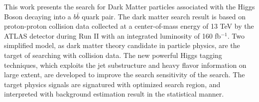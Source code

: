 This work presents the search for Dark Matter particles associated with the Higgs Boson decaying into a $b\bar{b}$ quark pair. 
The dark matter search result is based on proton-proton collision data collected at a center-of-mass energy of 13 TeV by the ATLAS detector during Run II with an integrated luminosity of 160 fb$^{-1}$. 
Two simplified model, as dark matter theory candidate in particle physics, are the target of searching with collision data. 
The new powerful Higgs tagging techniques, which exploits the jet substructure and heavy flavor information on large extent, are developed to improve the search sensitivity of the search. 
The target physics signals are signatured with optimized search region, and interpreted with background estimation result in the statistical manner.
